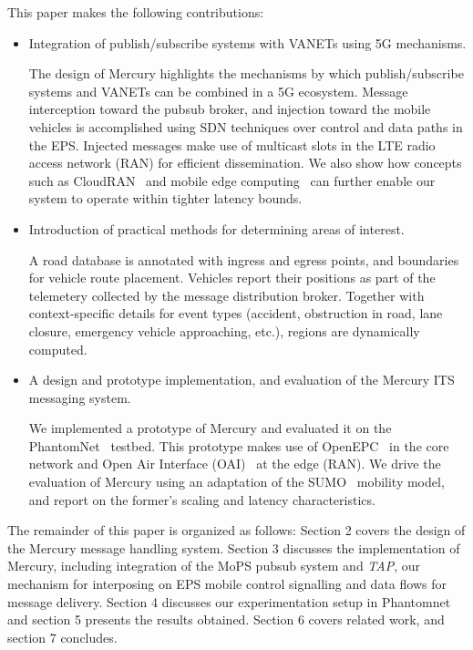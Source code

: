 This paper makes the following contributions:
\begin{itemize}

\item Integration of publish/subscribe systems with VANETs using 5G mechanisms.

The design of Mercury highlights the mechanisms by which
publish/subscribe systems and VANETs can be combined in a 5G
ecosystem. Message interception toward the pubsub broker, and
injection toward the mobile vehicles is accomplished using SDN
techniques over control and data paths in the EPS. Injected messages
make use of multicast slots in the LTE radio access network (RAN) for
efficient dissemination.  We also show how concepts such as
CloudRAN~\cite{checko2015cloud} and mobile edge computing~\cite{mobile-edge}
can further enable our system to operate within tighter latency bounds.

\item Introduction of practical methods for determining areas of interest.

A road database is annotated with ingress and egress points, and
boundaries for vehicle route placement.  Vehicles report their
positions as part of the telemetery collected by the message
distribution broker.  Together with context-specific details for event
types (accident, obstruction in road, lane closure, emergency vehicle
approaching, etc.), regions are dynamically computed.

\item A design and prototype implementation, and evaluation of the
  Mercury ITS messaging system.

We implemented a prototype of Mercury and evaluated it on the
PhantomNet~\cite{banerjee2015phantomnet} testbed.  This prototype makes use of
OpenEPC~\cite{corici2010openepc} in the core network and Open Air Interface
(OAI)~\cite{OAI} at the edge (RAN).  We drive the evaluation of Mercury
using an adaptation of the SUMO~\cite{behrisch2011sumo} mobility model, and
report on the former's scaling and latency characteristics.

\end{itemize}

The remainder of this paper is organized as follows: Section 2 covers
the design of the Mercury message handling system.  Section 3
discusses the implementation of Mercury, including integration of the
MoPS pubsub system and \emph{TAP}, our mechanism for interposing on
EPS mobile control signalling and data flows for message delivery.
Section 4 discusses our experimentation setup in Phantomnet and
section 5 presents the results obtained.  Section 6 covers related
work, and section 7 concludes.
